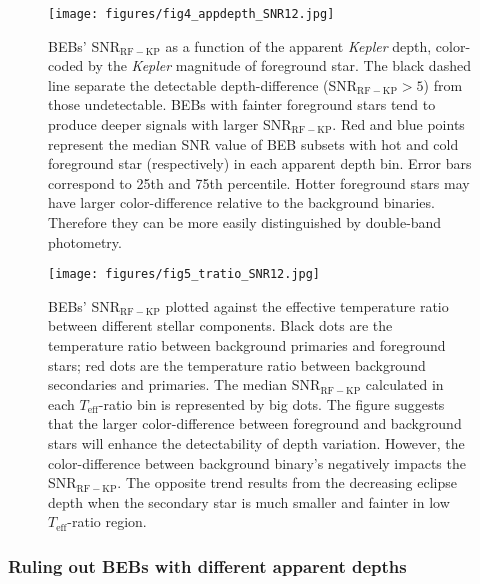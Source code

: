 \documentclass{aastex63}
\begin{document}
    \begin{figure}[ht]
        \centering
        \texttt{[image: figures/fig4\_appdepth\_SNR12.jpg]}
        \caption{BEBs' SNR$_\mathrm{RF-KP}$ as a function of the apparent \emph{Kepler} depth, color-coded by the \emph{Kepler} magnitude of foreground star. The black dashed line separate the detectable depth-difference (SNR$_\mathrm{RF-KP}>5$) from those undetectable. BEBs with fainter foreground stars tend to produce deeper signals with larger SNR$_\mathrm{RF-KP}$. Red and blue points represent the median SNR value of BEB subsets with hot and cold foreground star (respectively) in each apparent depth bin. Error bars correspond to 25th and 75th percentile. Hotter foreground stars may have larger color-difference relative to the background binaries. Therefore they can be more easily distinguished by double-band photometry.}
        \label{fig:beb_SNR_vs_kpdepth}
    \end{figure}
    
    \begin{figure}[ht]
        \centering
        \texttt{[image: figures/fig5\_tratio\_SNR12.jpg]}
        \caption{BEBs' SNR$_\mathrm{RF-KP}$ plotted against the effective temperature ratio between different stellar components. Black dots are the temperature ratio between background primaries and foreground stars; red dots are the temperature ratio between background secondaries and primaries. The median SNR$_\mathrm{RF-KP}$ calculated  in each $T_\mathrm{eff}$-ratio bin is represented by big dots. The figure suggests that the larger color-difference between foreground and background stars will enhance the detectability of depth variation. However, the color-difference between background binary's negatively impacts the SNR$_\mathrm{RF-KP}$. The opposite trend results from the decreasing eclipse depth when the secondary star is much smaller and fainter in low $T_\mathrm{eff}$-ratio region.}
        \label{fig:tratio_SNR12}
    \end{figure}
    
    \subsubsection{Ruling out BEBs with different apparent depths}
    
\end{document}
